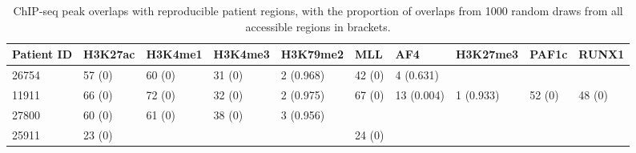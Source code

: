\begin{table}

    \centering
    \tiny
    \begin{tabular}[t]{llllllllll}
    \toprule
    Patient ID & H3K27ac & H3K4me1 & H3K4me3 & H3K79me2 & MLL & AF4 & H3K27me3 & PAF1c & RUNX1\\
    \midrule
    26754 & 57 (0) & 60 (0) & 31 (0) & 2 (0.968) & 42 (0) & 4 (0.631) &   &   &  \\
    11911 & 66 (0) & 72 (0) & 32 (0) & 2 (0.975) & 67 (0) & 13 (0.004) & 1 (0.933) & 52 (0) & 48 (0)\\
    27800 & 60 (0) & 61 (0) & 38 (0) & 3 (0.956) &   &   &   &   &  \\
    25911 & 23 (0) &   &   &   & 24 (0) &   &   &   &  \\
    \bottomrule
    \end{tabular}
    \caption{ChIP-seq peak overlaps with reproducible patient regions, with the proportion of overlaps from 1000 random draws from all accessible regions in brackets. }
    \label{table:mll_chip}
    \end{table}


